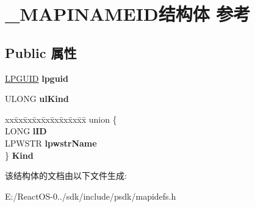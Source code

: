 \hypertarget{struct___m_a_p_i_n_a_m_e_i_d}{}\section{\+\_\+\+M\+A\+P\+I\+N\+A\+M\+E\+I\+D结构体 参考}
\label{struct___m_a_p_i_n_a_m_e_i_d}
\subsection*{Public 属性}
\begin{DoxyCompactItemize}
\item 
\mbox{\label{struct___m_a_p_i_n_a_m_e_i_d_a6b42371dd2bf4de3038d43d059d8e19d}} 
\hyperlink{interface_g_u_i_d}{L\+P\+G\+U\+ID} {\bfseries lpguid}
\item 
\mbox{\label{struct___m_a_p_i_n_a_m_e_i_d_a2699a2663ffcdc8889158e0ecbf7f480}} 
U\+L\+O\+NG {\bfseries ul\+Kind}
\item 
\mbox{\label{struct___m_a_p_i_n_a_m_e_i_d_af3bbb31d75d2cddc1805d407f68137d7}} 
\begin{tabbing}
xx\=xx\=xx\=xx\=xx\=xx\=xx\=xx\=xx\=\kill
union \{\\
\>LONG {\bfseries lID}\\
\>LPWSTR {\bfseries lpwstrName}\\
\} {\bfseries Kind}\\

\end{tabbing}\end{DoxyCompactItemize}


该结构体的文档由以下文件生成\+:\begin{DoxyCompactItemize}
\item 
E\+:/\+React\+O\+S-\/0../sdk/include/psdk/mapidefs.\+h\end{DoxyCompactItemize}
